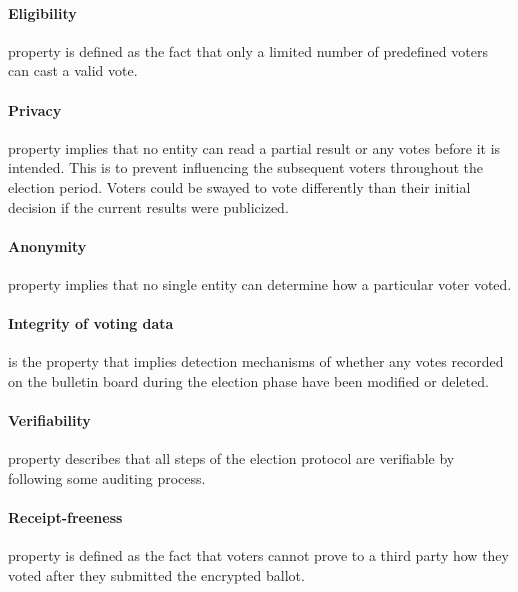 \paragraph{Eligibility} property is defined as the fact that only a limited number of predefined voters can cast a valid vote. 

\paragraph{Privacy} property implies that no entity can read a partial result or any votes before it is intended. This is to prevent influencing the subsequent voters throughout the election period. Voters could be swayed to vote differently than their initial decision if the current results were publicized.

\paragraph{Anonymity} property implies that no single entity can determine how a particular voter voted.

\paragraph{Integrity of voting data} is the property that implies detection mechanisms of whether any votes recorded on the bulletin board during the election phase have been modified or deleted.

\paragraph{Verifiability} property describes that all steps of the election protocol are verifiable by following some auditing process.

\paragraph{Receipt-freeness} property is defined as the fact that voters cannot prove to a third party how they voted after they submitted the encrypted ballot.
